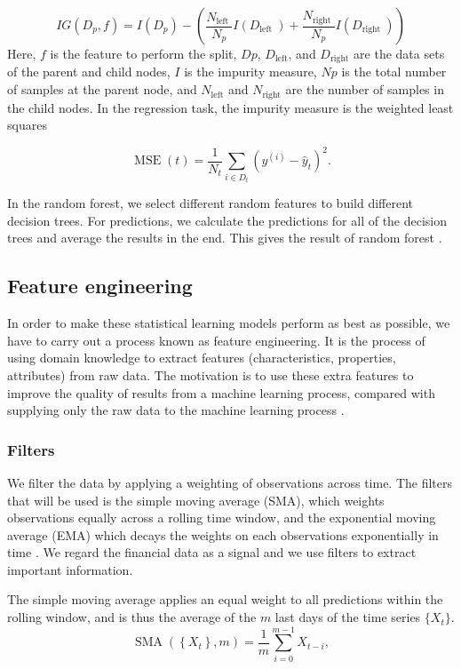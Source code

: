 \documentclass[twoside]{report}
\begin{document}
\begin{spacing}{1}
$$
I G\left(D_{p}, f\right)=I\left(D_{p}\right)-\left(\frac{N_{\text {left }}}{N_{p}} I\left(D_{\text {left }}\right)+\frac{N_{\text {right }}}{N_{p}} I\left(D_{\text {right }}\right)\right)
$$
Here, $f$ is the feature to perform the split, $Dp$, $D_{\text{left}}$, and $D_{\text{right}}$ are the data sets of the parent and child nodes, $I$ is the impurity measure, $Np$ is the total number of samples at the parent node, and $N_{\text{left}}$ and $N_{\text{right}}$ are the number of samples in the child nodes. In the regression task, the impurity measure is the weighted least squares

\[
\operatorname{MSE}(t)=\frac{1}{N_{t}} \sum_{i \in D_{t}}\left(y^{(i)}-\hat{y}_{t}\right)^{2}.
\]

In the random forest, we select different random features to build different decision trees. For predictions, we calculate the predictions for all of the decision trees and average the results in the end. This gives the result of random forest \cite{segal2004machine}.





\subsection{Feature engineering}
In order to make these statistical learning models perform as best as possible, we have to carry out a process known as feature engineering. It is the process of using domain knowledge to extract features (characteristics, properties, attributes) from raw data. The motivation is to use these extra features to improve the quality of results from a machine learning process, compared with supplying only the raw data to the machine learning process \cite{heaton2016empirical}. 
\subsubsection{Filters}
We filter the data by applying a weighting of observations across time. The
filters that will be used is the simple moving average (SMA), which weights
observations equally across a rolling time window, and the exponential moving average (EMA) which decays the weights on each observations exponentially in time \cite{brockwell2016introduction}. We regard the financial data as a signal and we use filters to extract important information.


The simple moving average applies an equal weight to all predictions within the rolling window, and is thus the average of the $m$ last days of the time series $\{X_t\}$.
\[
\operatorname{SMA}\left(\left\{X_{t}\right\}, m\right)=\frac{1}{m} \sum_{i=0}^{m-1} X_{t-i},
\]


\end{spacing}
\end{document}

